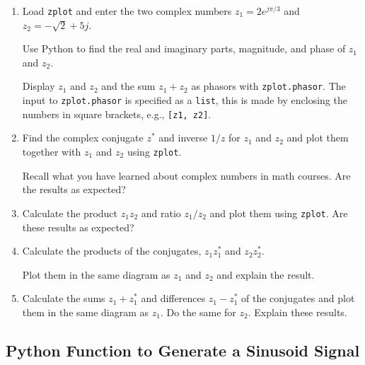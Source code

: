 \begin{enumerate}[1)]
	\item Load \verb|zplot| and enter the two complex numbers $z_1 = 2e^{j\pi/3}$ and $z_2= -\sqrt{2} + 5j$. 
	
		Use Python to find the real and imaginary parts, magnitude, and phase of $z_1$ and $z_2$.
	
		Display $z_1$ and $z_2$ and the sum $z_1+z_2$ as phasors with \verb|zplot.phasor|. 		
		The input to \verb|zplot.phasor| is specified as a \verb|list|, this is made by enclosing the numbers in square brackets, e.g., \verb|[z1, z2]|.

	\item Find the complex conjugate $z^*$ and inverse $1/z$ for $z_1$ and $z_2$ and plot them together with $z_1$ and $z_2$ using \verb|zplot|.
	
		Recall what you have learned about complex numbers in math courses. Are the results as expected?
			
	\item Calculate the product $z_1 z_2$ and ratio $z_1/z_2$ and plot them using \verb|zplot|. 	
		Are these results as expected?

	\item Calculate the products of the conjugates, $z_1 z_1^*$ and $z_2 z_2^*$. 
	
	Plot them in the same diagram as $z_1$ and $z_2$ and explain the result.

	\item Calculate the sums $z_1+z_1^*$ and differences $z_1-z_1^*$ of the conjugates and plot them in the same diagram as $z_1$. Do the same for $z_2$. Explain these results.
		
\end{enumerate}
		
		
\subsection{Python Function to Generate a Sinusoid Signal }

